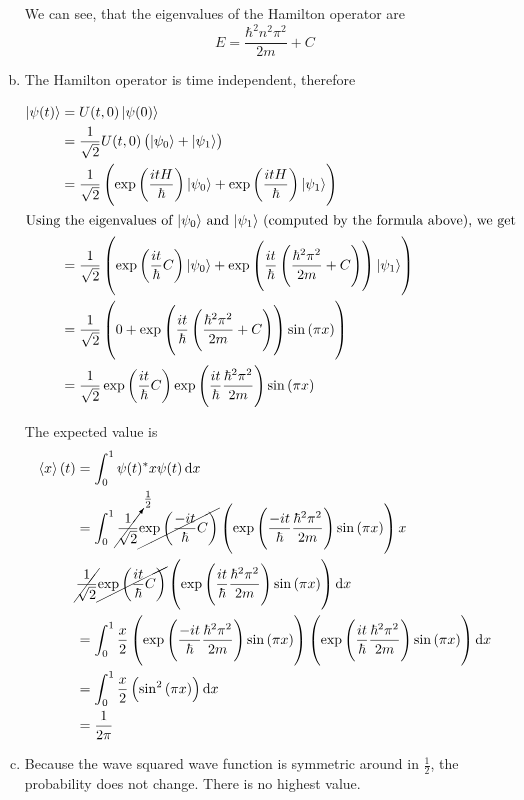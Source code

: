 \documentclass[a4paper,german,12pt,smallheadings]{scrartcl}
\begin{document}
\begin{enumerate}[a)]
    We can see, that the eigenvalues of the Hamilton operator are
    \begin{equation*}
      E = \frac{\hbar^2 n^2 \pi^2}{2m} + C
    \end{equation*}

  \item
    The Hamilton operator is time independent, therefore

    \begin{align*}
      \ket{\psi(t)} &= U(t,0) \ket{\psi(0)} \\
                    &= \frac{1}{\sqrt{2}} U(t,0) \del{\ket{\psi_0} + \ket{\psi_1}} \\
                    &= \frac{1}{\sqrt{2}} \del{\exp\del{\frac{itH}{\hbar}} \ket{\psi_0} + \exp\del{\frac{itH}{\hbar}} \ket{\psi_1}} \\
      \intertext{Using the eigenvalues of $\ket{\psi_0}$ and $\ket{\psi_1}$ (computed by the formula above), we get}
      &= \frac{1}{\sqrt{2}} \del{\exp\del{\frac{it}{\hbar} C} \ket{\psi_0} + \exp\del{\frac{it}{\hbar} \del{\frac{\hbar^2 \pi^2}{2m} + C}} \ket{\psi_1}} \\
      &= \frac{1}{\sqrt{2}} \del{0+ \exp\del{\frac{it}{\hbar} \del{\frac{\hbar^2 \pi^2}{2m} + C}} \sin\del{\pi x}} \\
      &= \frac{1}{\sqrt{2}} \exp\del{\frac{it}{\hbar} C} \exp\del{\frac{it}{\hbar} \frac{\hbar^2 \pi^2}{2m}} \sin\del{\pi x} \\
    \end{align*}

    The expected value is
    \begin{align*}
      \braket{x}(t) &= \int_{0}^{1} \psi(t)^* x \psi(t) \dif x \\
                    &= \int_{0}^{1}
      \cancelto{\frac{1}{2}}{\frac{1}{\sqrt{2}}} \cancel{\exp\del{\frac{-it}{\hbar} C}} \del{\exp\del{\frac{-it}{\hbar} \frac{\hbar^2 \pi^2}{2m}} \sin\del{\pi x}}
                       x \\
                       &\cancel{\frac{1}{\sqrt{2}}} \cancel{\exp\del{\frac{it}{\hbar} C}} \del{\exp\del{\frac{it}{\hbar} \frac{\hbar^2 \pi^2}{2m}} \sin\del{\pi x}}
                        \dif x \\
                    &=
                       \int_0^1 \frac{x}{2} \del{\exp\del{\frac{-it}{\hbar} \frac{\hbar^2 \pi^2}{2m}} \sin\del{\pi x}}
                       \del{\exp\del{\frac{it}{\hbar} \frac{\hbar^2 \pi^2}{2m}} \sin\del{\pi x}} \dif x \\
                       &= \int_0^1 \frac{x}{2}\del{\sin^2\del{\pi x}} \dif x \\
                       &= \frac{1}{2 \pi}
                     \end{align*}
  \item
    Because the wave squared wave function is symmetric around in
    $\frac{1}{2}$, the probability does not change. There is no highest value.
\end{enumerate}
\end{document}
